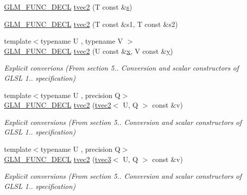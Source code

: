 \begin{DoxyCompactItemize}
\hyperlink{setup_8hpp_ab2d052de21a70539923e9bcbf6e83a51}{G\+L\+M\+\_\+\+F\+U\+N\+C\+\_\+\+D\+E\+CL} \hyperlink{structglm_1_1detail_1_1tvec2_a85607050278fcecc58b31197bfff1661}{tvec2} (T const \&\hyperlink{structglm_1_1detail_1_1tvec2_a6d602cf7c31b75396944d828ad2aea72}{s})
\item 
\hyperlink{setup_8hpp_ab2d052de21a70539923e9bcbf6e83a51}{G\+L\+M\+\_\+\+F\+U\+N\+C\+\_\+\+D\+E\+CL} \hyperlink{structglm_1_1detail_1_1tvec2_a1c01dd00c55f77aae7bbb7e33ca85c54}{tvec2} (T const \&s1, T const \&s2)
\item 
{\footnotesize template$<$typename U , typename V $>$ }\\\hyperlink{setup_8hpp_ab2d052de21a70539923e9bcbf6e83a51}{G\+L\+M\+\_\+\+F\+U\+N\+C\+\_\+\+D\+E\+CL} \hyperlink{structglm_1_1detail_1_1tvec2_a7521b4e5e4260e7e53f936b01b18e3c7}{tvec2} (U const \&\hyperlink{structglm_1_1detail_1_1tvec2_a8eaf23d68c8d88949166dc2f641d19ba}{x}, V const \&\hyperlink{structglm_1_1detail_1_1tvec2_ab30528ab747cef8d129cf793aeec521a}{y})
\begin{DoxyCompactList}\small\item\em Explicit converions (From section 5.. Conversion and scalar constructors of G\+L\+SL 1.. specification) \end{DoxyCompactList}\item 
{\footnotesize template$<$typename U , precision Q$>$ }\\\hyperlink{setup_8hpp_ab2d052de21a70539923e9bcbf6e83a51}{G\+L\+M\+\_\+\+F\+U\+N\+C\+\_\+\+D\+E\+CL} \hyperlink{structglm_1_1detail_1_1tvec2_aac611127f03f3948bacb14b063fa3aca}{tvec2} (\hyperlink{structglm_1_1detail_1_1tvec2}{tvec2}$<$ U, Q $>$ const \&v)
\begin{DoxyCompactList}\small\item\em Explicit conversions (From section 5.. Conversion and scalar constructors of G\+L\+SL 1.. specification) \end{DoxyCompactList}\item 
{\footnotesize template$<$typename U , precision Q$>$ }\\\hyperlink{setup_8hpp_ab2d052de21a70539923e9bcbf6e83a51}{G\+L\+M\+\_\+\+F\+U\+N\+C\+\_\+\+D\+E\+CL} \hyperlink{structglm_1_1detail_1_1tvec2_a79d0d9907539559a9c5cea20a57ad669}{tvec2} (\hyperlink{structglm_1_1detail_1_1tvec3}{tvec3}$<$ U, Q $>$ const \&v)
\begin{DoxyCompactList}\small\item\em Explicit conversions (From section 5.. Conversion and scalar constructors of G\+L\+SL 1.. specification) \end{DoxyCompactList}\item 

\end{DoxyCompactItemize}

